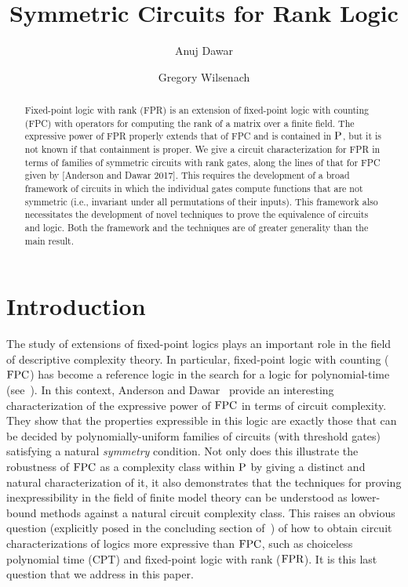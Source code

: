 \documentclass[a4paper,UKenglish]{lipics-v2018}
\title{Symmetric Circuits for Rank Logic}
\author{Anuj Dawar}{Department of Computer Science and Technology,
  University of Cambridge}{anuj.dawar@cl.cam.ac.uk}{0000-0003-4014-8248}{}%
\author{Gregory Wilsenach}{Department of Computer Science and
  Technology, University of Cambridge}{gregory.wilsenach@cl.cam.ac.uk}{}{Funding
  provided by the Gates Cambridge Scholarship}
\begin{document}
\maketitle

\begin{abstract}
  Fixed-point logic with rank (FPR) is an extension of fixed-point logic with
  counting (FPC) with operators for computing the rank of a matrix over a finite
  field. The expressive power of FPR properly extends that of FPC and is
  contained in $\mathrm{P}$, but it is not known if that containment is proper. We give a
  circuit characterization for FPR in terms of families of symmetric circuits
  with rank gates, along the lines of that for FPC given by [Anderson and Dawar
  2017]. This requires the development of a broad framework of circuits in which
  the individual gates compute functions that are not symmetric (i.e., invariant
  under all permutations of their inputs). This framework also necessitates the
  development of novel techniques to prove the equivalence of circuits and
  logic. Both the framework and the techniques are of greater generality than
  the main result.
\end{abstract}

\section{Introduction}\label{sec:introduction}

The study of extensions of fixed-point logics plays an important role in the
field of descriptive complexity theory. In particular, fixed-point logic with
counting ($\text{\upshape FPC}$) has become a reference logic in the search for a logic for
polynomial-time (see~\cite{Dawar-siglog}). In this context, Anderson and
Dawar~\cite{AndersonD17} provide an interesting characterization of the
expressive power of $\text{\upshape FPC}$ in terms of circuit complexity. They show that the
properties expressible in this logic are exactly those that can be decided by
polynomially-uniform families of circuits (with threshold gates) satisfying a
natural \emph{symmetry} condition. Not only does this illustrate the robustness
of $\text{\upshape FPC}$ as a complexity class within $\mathrm{P}$ by giving a distinct and natural
characterization of it, it also demonstrates that the techniques for proving
inexpressibility in the field of finite model theory can be understood as
lower-bound methods against a natural circuit complexity class. This raises an
obvious question (explicitly posed in the concluding section
of~\cite{AndersonD17}) of how to obtain circuit characterizations of logics more
expressive than $\text{\upshape FPC}$, such as choiceless polynomial time (CPT) and fixed-point
logic with rank ($\text{\upshape FPR}$). It is this last question that we address in this
paper.
\end{document}
